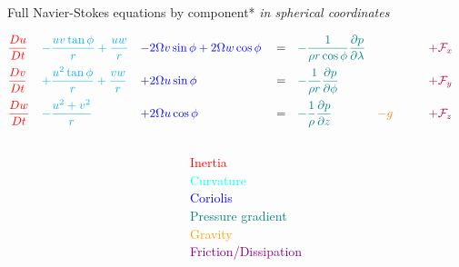 \documentclass[aspectratio=169,xcolor=dvipsnames]{beamer}
\begin{document}
\begin{frame}{Full Navier-Stokes equations by component*}
\vspace{0em}
\hspace{10cm}
{\small *\emph{in spherical coordinates}}

\begin{align*}
    &\textcolor{red}{    \frac{Du}{Dt}   }&
    &\textcolor{cyan}{   - \frac{uv \tan\phi}{r} + \frac{uw}{r}  }& 
    & \textcolor{blue}{   - 2\Omega v \sin\phi + 2\Omega w \cos\phi   }&
    & = &
    &\textcolor{teal}{   -\frac{1}{\rho r \cos\phi}\frac{\partial p}{\partial \lambda}  }&
    &&
    & \textcolor{purple}{\quad + \mathcal{F}_x }&
    \\
    &\textcolor{red}{    \frac{Dv}{Dt}   } &
    &\textcolor{cyan}{   + \frac{u^2 \tan\phi}{r} + \frac{vw}{r}     }&
    & \textcolor{blue}{   + 2\Omega u \sin\phi    }&
    & = &
    &\textcolor{teal}{   -\frac{1}{\rho r}\frac{\partial p}{\partial \phi}  }&
    &&
    & \textcolor{purple}{\quad + \mathcal{F}_y }&
    \\
    &\textcolor{red}{    \frac{Dw}{Dt}   } &
    &\textcolor{cyan}{   - \frac{u^2 + v^2}{r}   }&
    & \textcolor{blue}{   + 2\Omega u \cos\phi    }&
    & = &
    &\textcolor{teal}{   -\frac{1}{\rho}\frac{\partial p}{\partial z} }&
    & \textcolor{orange}{- g \quad}&
    & \textcolor{purple}{\quad + \mathcal{F}_z }&
\end{align*}

\begin{columns}
    \begin{column}{0.6\textwidth}
    \end{column}
    \begin{column}{0.4\textwidth}
        \begin{flushright}
            \vspace{-2em}
            {\footnotesize 
            \textcolor{red}{Inertia} \\
            \textcolor{cyan}{Curvature} \\
            \textcolor{blue}{Coriolis} \\
            \textcolor{teal}{Pressure gradient} \\
            \textcolor{orange}{Gravity} \\
            \textcolor{purple}{Friction/Dissipation}
            }
        \end{flushright}
    \end{column}
\end{columns}
        
\end{frame}
\end{document}
